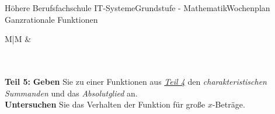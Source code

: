 \documentclass[oneside,openany,headings=optiontotoc,11pt,numbers=noenddot]{scrreprt}
\begin{document}
\begin{worksheet}{Höhere Berufsfachschule IT-Systeme}{Grundstufe - Mathematik}{Wochenplan Ganzrationale Funktionen}
\begin{framed}
\begin{tabularx}{\textwidth}{M|M}
				& \\
				\hline
				\\
				\\
			\end{tabularx}
		\end{framed}
		\begin{framed}
			\noindent
			\textbf{Teil 5:} \textbf{Geben} Sie zu einer Funktionen aus \textit{\underline{Teil 4}} den \textit{charakteristischen Summanden} und das \textit{Absolutglied} an.\\
			\textbf{Untersuchen} Sie das Verhalten der Funktion für große \(x\)-Beträge.
		\end{framed}
	\end{worksheet}
\end{document}
